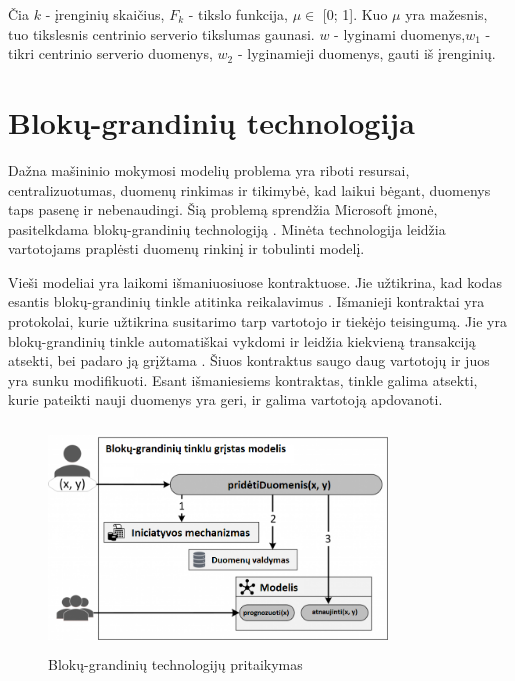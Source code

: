 \documentclass{VUMIFInfBakalaurinis}
\begin{document}
\par Čia $k$ - įrenginių skaičius, $F_{k}$ - tikslo funkcija, $\mu \in$ [0; 1]. Kuo $\mu$ yra mažesnis, tuo tikslesnis centrinio serverio tikslumas gaunasi. $w$ - lyginami duomenys,$w_{1}$ - tikri centrinio serverio duomenys, $w_{2}$ - lyginamieji duomenys, gauti iš įrenginių.

\section{Blokų-grandinių technologija}
\par Dažna mašininio mokymosi modelių problema yra riboti resursai, centralizuotumas, duomenų rinkimas ir tikimybė, kad laikui bėgant, duomenys taps pasenę ir nebenaudingi. Šią problemą sprendžia Microsoft įmonė, pasitelkdama blokų-grandinių technologiją \cite{25}.  Minėta technologija leidžia vartotojams praplėsti duomenų rinkinį ir tobulinti modelį.
\par Vieši modeliai yra laikomi išmaniuosiuose kontraktuose. Jie užtikrina, kad kodas esantis blokų-grandinių tinkle atitinka reikalavimus \cite{25}.  Išmanieji kontraktai yra protokolai, kurie užtikrina susitarimo tarp vartotojo ir tiekėjo teisingumą. Jie yra blokų-grandinių tinkle automatiškai vykdomi ir leidžia kiekvieną transakciją atsekti, bei padaro ją grįžtama \cite{26}. Šiuos kontraktus saugo daug vartotojų ir juos yra sunku modifikuoti. Esant išmaniesiems kontraktas, tinkle galima atsekti, kurie pateikti nauji duomenys yra geri, ir galima vartotoją apdovanoti.

\begin{figure}[h]
  \centering
  \includegraphics[width=9cm,height=6cm,keepaspectratio]{img/blockchain_1.png}
  \caption{Blokų-grandinių technologijų pritaikymas \cite{25}}
  \label{fig:Blokų-grandinių technologijų pritaikymas}
\end{figure}
\end{document}
